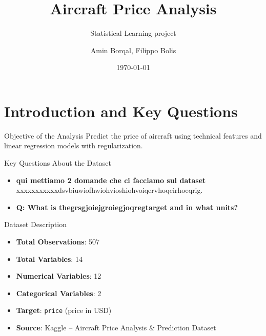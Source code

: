 \documentclass{beamer}
\title{Aircraft Price Analysis}
\subtitle{Statistical Learning project}
\author{Amin Borqal, Filippo Bolis}
\date{\today}
\begin{document}
\maketitle



\section{Introduction and Key Questions}

\begin{frame}{Objective of the Analysis}
  Predict the price of aircraft using technical features and linear regression models with regularization.
\end{frame}

\begin{frame}{Key Questions About the Dataset}
  \begin{block}{}
    \begin{itemize}
      \item \textbf{qui mettiamo 2 domande che ci facciamo sul dataset }\\
            xxxxxxxxxxxdsvbiuwiofhwiohvioshiohvoiqervhoqeirhoeqrig.
      \item \textbf{Q: What is thegrsgjoiejgroiegjoqregtarget and in what units?}\\

    \end{itemize}
  \end{block}
\end{frame}

\begin{frame}{Dataset Description}
    \begin{itemize}
        \item \textbf{Total Observations}: 507
        \item \textbf{Total Variables}: 14
        \item \textbf{Numerical Variables}: 12
        \item \textbf{Categorical Variables}: 2
        \item \textbf{Target}: \texttt{price} (price in USD)
        \item \textbf{Source}: Kaggle – Aircraft Price Analysis \& Prediction Dataset
    \end{itemize}
\end{frame}
\end{document}
